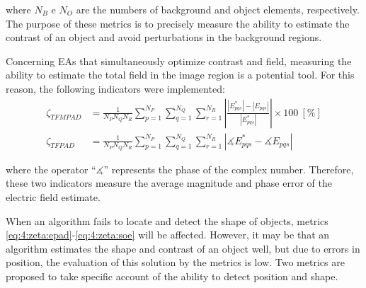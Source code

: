 				\noindent where $N_B$ e $N_O$ are the numbers of background and object elements, respectively. The purpose of these metrics is to precisely measure the ability to estimate the contrast of an object and avoid perturbations in the background regions.
				
				Concerning EAs that simultaneously optimize contrast and field, measuring the ability to estimate the total field in the image region is a potential tool. For this reason, the following indicators were implemented:
				\begin{align}
					\zeta_{TFMPAD} &= \frac{1}{N_PN_QN_R}\sum\limits_{p=1}^{N_P}\sum\limits_{q=1}^{N_Q}\sum\limits_{r=1}^{N_R}\left|\frac{|E^*_{pqs}|-|E_{pqs}|}{|E^*_{pqs}|}\right|\times100~[\%] \label{eq:4:zeta:tfmpad} \\
					\zeta_{TFPAD} &= \frac{1}{N_PN_QN_R}\sum\limits_{p=1}^{N_P}\sum\limits_{q=1}^{N_Q}\sum\limits_{r=1}^{N_R}\left|\measuredangle E^*_{pqs} - \measuredangle E_{pqs}\right| \label{eq:4:zeta:tfpad}
				\end{align}
			
				\noindent where the operator ``$\measuredangle$'' represents the phase of the complex number. Therefore, these two indicators measure the average magnitude and phase error of the electric field estimate.
				
				When an algorithm fails to locate and detect the shape of objects, metrics \eqref{eq:4:zeta:epad}-\eqref{eq:4:zeta:soe} will be affected. However, it may be that an algorithm estimates the shape and contrast of an object well, but due to errors in position, the evaluation of this solution by the metrics is low. Two metrics are proposed to take specific account of the ability to detect position and shape.
				
